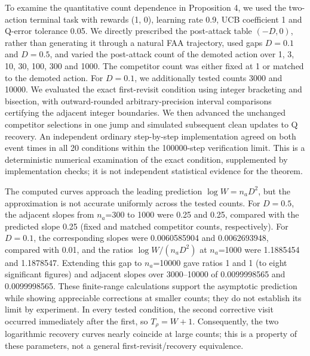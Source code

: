 To examine the quantitative count dependence in Proposition 4, we used the two-action terminal task with rewards (1, 0), learning rate 0.9, UCB coefficient 1 and Q-error tolerance 0.05. We directly prescribed the post-attack table $(-D,0)$, rather than generating it through a natural FAA trajectory, used gaps $D=0.1$ and $D=0.5$, and varied the post-attack count of the demoted action over 1, 3, 10, 30, 100, 300 and 1000. The competitor count was either fixed at 1 or matched to the demoted action. For $D=0.1$, we additionally tested counts 3000 and 10000. We evaluated the exact first-revisit condition using integer bracketing and bisection, with outward-rounded arbitrary-precision interval comparisons certifying the adjacent integer boundaries. We then advanced the unchanged competitor selections in one jump and simulated subsequent clean updates to Q recovery. An independent ordinary step-by-step implementation agreed on both event times in all 20 conditions within the 100000-step verification limit. This is a deterministic numerical examination of the exact condition, supplemented by implementation checks; it is not independent statistical evidence for the theorem.

The computed curves approach the leading prediction $\log W=n_aD^2$, but the approximation is not accurate uniformly across the tested counts. For $D=0.5$, the adjacent slopes from $n_a$=300 to 1000 were 0.25 and 0.25, compared with the predicted slope 0.25 (fixed and matched competitor counts, respectively). For $D=0.1$, the corresponding slopes were 0.0060585904 and 0.0062693948, compared with 0.01, and the ratios $\log W/(n_aD^2)$ at $n_a$=1000 were 1.1885454 and 1.1878547. Extending this gap to $n_a$=10000 gave ratios 1 and 1 (to eight significant figures) and adjacent slopes over 3000--10000 of 0.0099998565 and 0.0099998565. These finite-range calculations support the asymptotic prediction while showing appreciable corrections at smaller counts; they do not establish its limit by experiment. In every tested condition, the second corrective visit occurred immediately after the first, so $T_\rho=W+1$. Consequently, the two logarithmic recovery curves nearly coincide at large counts; this is a property of these parameters, not a general first-revisit/recovery equivalence.
